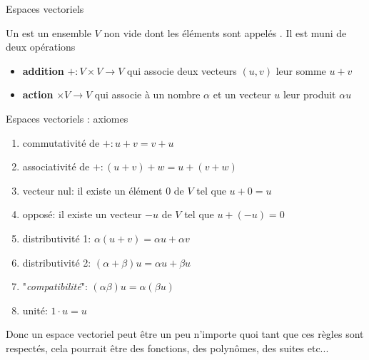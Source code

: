 \begin{parag}{Espaces vectoriels}
    \begin{definition}
        Un  est un ensemble $V$ non vide dont les éléments sont appelés . Il est muni de deux opérations
        \begin{itemize}
            \item \textbf{addition} $+ : V \times V \to V$ qui associe deux vecteurs $(u, v)$ leur somme $u + v$
            \item \textbf{action} \R$ \times V \to V$ qui associe à un nombre $\alpha$ et un vecteur $u$ leur produit $\alpha u$
        \end{itemize}
    \end{definition}
    \begin{subparag}{Espaces vectoriels : axiomes}
        \begin{enumerate}
            \item commutativité de $+ : u + v = v + u$
            \item associativité de $+ : (u+v) + w = u + (v + w)$
            \item vecteur nul: il existe un élément $0$ de $V$ tel que $u  +0 = u$
            \item opposé: il existe un vecteur $-u$ de $V$ tel que $u + (-u) = 0$
            \item distributivité 1: $\alpha(u + v) = \alpha u + \alpha v$
            \item distributivité 2: $(\alpha + \beta) u = \alpha u + \beta u$
            \item "\textit{compatibilité}": $(\alpha\beta)u = \alpha(\beta u)$
            \item unité: $1 \cdot u = u$
        \end{enumerate}
    \end{subparag}
    \begin{framedremark}
        Donc un espace vectoriel peut être un peu n'importe quoi tant que ces règles sont respectés, cela pourrait être des fonctions, des polynômes, des suites etc...
    \end{framedremark}
\end{parag}